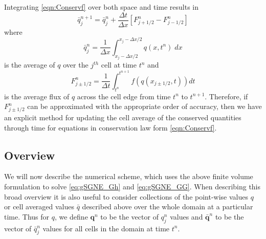 \documentclass[10pt]{elsarticle}
\newcommand{\vecn}[1]{\boldsymbol{#1}}
\begin{document}
Integrating \eqref{eqn:Conservf} over both space and time results in
\begin{equation}
\bar{q}^{n+1}_j = \bar{q}^{n}_j  +  \dfrac{\Delta t}{\Delta x}\left[F^n_{j+1/2} - F^n_{j-1/2}\right]
\label{eqn:ConsFVM}
\end{equation}
where 
\begin{equation*}
\bar{q}^n_j = \frac{1}{\Delta x} \int_{x_j - \Delta x / 2}^{x_j - \Delta x / 2} q(x,t^n) \; dx
\end{equation*}
is the average of $q$ over the $j^{th}$ cell at time $t^n$ and   
\begin{equation*}
F^n_{j\pm 1/2} =\frac{1}{\Delta t} \int_{t^n}^{t^{n+1}} f(q(x_{j\pm 1/2},t)) dt
\end{equation*}
is the average flux of $q$ across the cell edge from time $t^n$ to $t^{n+1}$. Therefore, if $F^n_{j\pm 1/2}$ can be approximated with the appropriate order of accuracy, then we have an explicit method for updating the cell average of the conserved quantities through time for equations in conservation law form \eqref{eqn:Conservf}. 



\subsection{Overview}
\label{subsec:Overview}
We will now describe the numerical scheme, which uses the above finite volume formulation to solve \eqref{eq:gSGNE_Gh} and \eqref{eq:gSGNE_GG}. When describing this broad overview it is also useful to consider collections of the point-wise values $q$ or cell averaged values $\bar{q}$ described above over the whole domain at a particular time. Thus for $q$, we define $\vecn{q}^n$ to be the vector of $q^n_j$ values and $\bar{\vecn{q}}^n$ to be the vector of $\bar{q}^n_j$ values for all cells in the domain at time $t^n$. 
\end{document}
